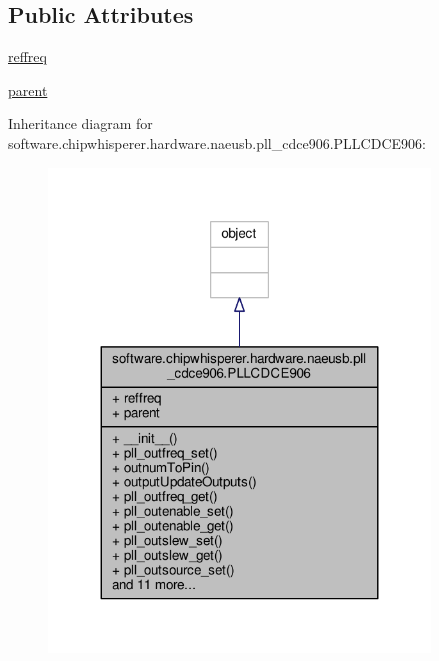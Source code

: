 \subsection*{Public Attributes}
\begin{DoxyCompactItemize}
\item 
\hyperlink{classsoftware_1_1chipwhisperer_1_1hardware_1_1naeusb_1_1pll__cdce906_1_1PLLCDCE906_ada843cecdb320caa252c171d238eb6a3}{reffreq}
\item 
\hyperlink{classsoftware_1_1chipwhisperer_1_1hardware_1_1naeusb_1_1pll__cdce906_1_1PLLCDCE906_ae29943ef5fe570ec7251044f75c60f01}{parent}
\end{DoxyCompactItemize}


Inheritance diagram for software.\+chipwhisperer.\+hardware.\+naeusb.\+pll\+\_\+cdce906.\+P\+L\+L\+C\+D\+C\+E906\+:\nopagebreak
\begin{figure}[H]
\begin{center}
\leavevmode
\includegraphics[width=287pt]{d6/da4/classsoftware_1_1chipwhisperer_1_1hardware_1_1naeusb_1_1pll__cdce906_1_1PLLCDCE906__inherit__graph}
\end{center}
\end{figure}


